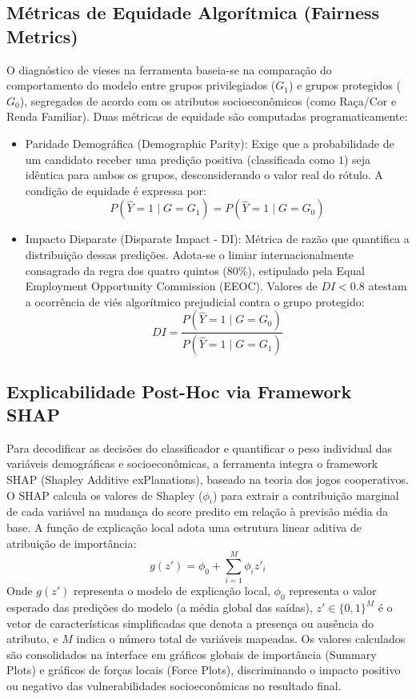 \subsection{Métricas de Equidade Algorítmica (Fairness Metrics)}O diagnóstico de vieses na ferramenta baseia-se na comparação do comportamento do modelo entre grupos privilegiados ($G_1$) e grupos protegidos ($G_0$), segregados de acordo com os atributos socioeconômicos (como Raça/Cor e Renda Familiar). Duas métricas de equidade são computadas programaticamente:
\begin{itemize}
    \item Paridade Demográfica (Demographic Parity): Exige que a probabilidade de um candidato receber uma predição positiva (classificada como $1$) seja idêntica para ambos os grupos, desconsiderando o valor real do rótulo. A condição de equidade é expressa por:
    \[
    P(\hat{Y} = 1 \mid G = G_1) = P(\hat{Y} = 1 \mid G = G_0)
    \]
    \item Impacto Disparate (Disparate Impact - DI): Métrica de razão que quantifica a distribuição dessas predições. Adota-se o limiar internacionalmente consagrado da regra dos quatro quintos ($80\%$), estipulado pela Equal Employment Opportunity Commission (EEOC). Valores de $DI < 0.8$ atestam a ocorrência de viés algorítmico prejudicial contra o grupo protegido:
    \[
    DI = \frac{P(\hat{Y} = 1 \mid G = G_0)}{P(\hat{Y} = 1 \mid G = G_1)}
    \]
\end{itemize}

\subsection{Explicabilidade Post-Hoc via Framework SHAP}Para decodificar as decisões do classificador e quantificar o peso individual das variáveis demográficas e socioeconômicas, a ferramenta integra o framework SHAP (Shapley Additive exPlanations), baseado na teoria dos jogos cooperativos. O SHAP calcula os valores de Shapley ($\phi_i$) para extrair a contribuição marginal de cada variável na mudança do score predito em relação à previsão média da base. A função de explicação local adota uma estrutura linear aditiva de atribuição de importância:
\[
g(z') = \phi_0 + \sum_{i=1}^{M} \phi_i z'_i
\]
Onde $g(z')$ representa o modelo de explicação local, $\phi_0$ representa o valor esperado das predições do modelo (a média global das saídas), $z' \in \{0, 1\}^M$ é o vetor de características simplificadas que denota a presença ou ausência do atributo, e $M$ indica o número total de variáveis mapeadas. Os valores calculados são consolidados na interface em gráficos globais de importância (Summary Plots) e gráficos de forças locais (Force Plots), discriminando o impacto positivo ou negativo das vulnerabilidades socioeconômicas no resultado final.